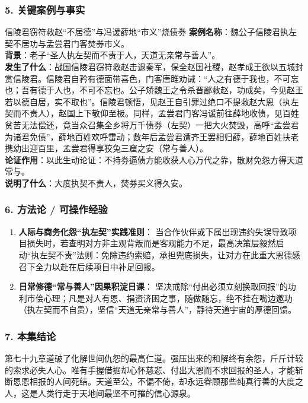 \subsubsection{5. 关键案例与事实}
\begin{CaseBox}{信陵君窃符救赵“不居德”与冯谖薛地“市义”烧债券}
\textbf{案例名称}：魏公子信陵君执左契不居功与孟尝君门客焚券市义。\\
\textbf{背景}：老子“圣人执左契而不责于人，天道无亲常与善人”。\\
\textbf{发生了什么}：战国信陵君窃符救赵击退秦军，保全赵国社稷，赵孝成王欲以五城封赏信陵君。信陵君自矜有德面带喜色，门客唐雎劝诫：“人之有德于我也，不可忘也；吾有德于人也，不可不忘也。公子矫魏王之令杀晋鄙救赵，功成矣，今见赵王若以德自居，实不取也”。信陵君顿悟，见赵王自引罪过绝口不提救赵大恩（执左契而不责人），赵国上下敬仰至极。同样，孟尝君门客冯谖前往薛地收债，见百姓贫苦无法偿还，竟当众召集全乡将万千债券（左契）一把大火焚毁，高呼“孟尝君为诸君免债”，薛地百姓欢呼雷动；数年后孟尝君遭齐王罢相归薛，薛地百姓扶老携幼出迎百里，孟尝君得享狡兔三窟之安（常与善人）。\\
\textbf{论证作用}：以此生动论证：不持券逼债方能收获人心万代之靠，散财免怨方得天道常与。\\
\textbf{说明了什么}：大度执契不责人，焚券买义得久安。
\end{CaseBox}

\subsubsection{6. 方法论 / 可操作经验}
\begin{enumerate}
    \item \textbf{人际与商务化怨“执左契”实践准则}：
    当合作伙伴或下属出现违约失误导致项目损失时，若查明对方非主观背叛而是客观能力不足，最高决策层毅然启动“执左契不责”法则：免除违约索赔，承担兜底损失，让对方在此重大恩德感召下全力以赴在后续项目中补足回报。
    \item \textbf{日常修德“常与善人”因果积淀日课}：
    坚决戒除“付出必须立刻换取回报”的功利市侩心理；凡是对人有恩、捐资济困之事，随做随忘，绝不挂在嘴边邀功（执左契而不自贵），坚信“天道无亲常与善人”，静待天道宇宙的厚德回馈。
\end{enumerate}

\subsubsection{7. 本集结论}
第七十九章道破了化解世间仇怨的最高仁道。强压出来的和解终有余怨，斤斤计较的索求必失人心。唯有手握借据却心怀慈悲、付出大恩而不求回报的圣人，才能斩断恩恩相报的人间死结。天道至公，不偏不倚，却永远眷顾那些纯真行善的大度之人，这是人类行走于天地间最坚不可摧的信心源泉。

